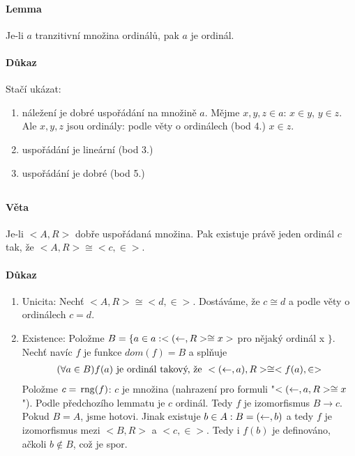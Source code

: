 \documentclass[a4paper,12pt,titlepage]{article}
\begin{document}
\paragraph{Lemma}
Je-li $a$ tranzitivní množina ordinálů, pak $a$ je ordinál.
\paragraph{Důkaz}
Stačí ukázat:
\begin{enumerate}
\item 
 náležení je dobré uspořádání na množině $a$. Mějme $x ,y, z \in
a$: $x \in y$, $y \in z$. Ale $x, y, z$ jsou ordinály: podle věty o ordinálech
(bod 4.) $x \in z$.
\item uspořádání je lineární (bod 3.)
\item uspořádání je dobré (bod 5.)
\end{enumerate}

\subsection{}
\setcounter{equation}{0}
\paragraph{Věta}
Je-li $<A, R>$ dobře uspořádaná množina. Pak existuje právě jeden ordinál $c$
tak, že $<A,R> \cong <c, \in>$.
\paragraph{Důkaz}
\begin{enumerate}
	\item Unicita: Nechť $<A, R> \cong <d, \in>$. Dostáváme, že $c \cong d$ a
	podle věty o ordinálech $c = d$.
	\item Existence: Položme $B = \{ a \in a : <(\leftarrow, R>\cong x> $ pro nějaký
	ordinál x $\}$. Nechť navíc $f$ je funkce $dom(f) = B$ a splňuje 
	\begin{align}
		(\forall a \in B) f(a) \text{ je ordinál takový, že } < (\leftarrow, a), R>
		\cong <f(a), \in>
	\end{align}
	Položme $c = \operatorname*{\,rng}(f)$: $c$ je množina (nahrazení pro formuli "$<(\leftarrow, a,
	R>\cong x$"). Podle předchozího lemmatu je $c$ ordinál. Tedy $f$ je
	izomorfismus $B \to c$. Pokud $B = A$, jsme hotovi. Jinak existuje $b \in A
	: B = (\leftarrow, b)$ a tedy $f$ je izomorfismus mezi $<B, R>$ a $<c, \in>$. Tedy
	i $f(b)$ je definováno, ačkoli $b \nin B$, což je spor.
\end{enumerate}
\end{document}
